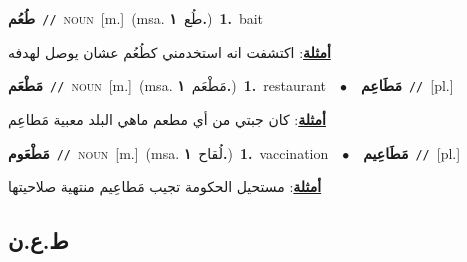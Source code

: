 \documentclass[10pt,a4paper,twoside]{article} %
\begin{document}
\begin{multicols}{2}
{\setlength\topsep{0pt}\textbf{\foreignlanguage{arabic}{طُعُم}}\ {\color{gray}\texttt{//}\color{black}}\ \textsc{noun}\ [m.]\ \color{gray}(msa. \foreignlanguage{arabic}{طُع}~\foreignlanguage{arabic}{\textbf{١.}})\color{black}\ \textbf{1.}~bait\  \begin{flushright}\color{gray}\foreignlanguage{arabic}{\textbf{\underline{\foreignlanguage{arabic}{أمثلة}}}: اكتشفت انه استخدمني كطُعُم عشان يوصل لهدفه}\end{flushright}\color{black}} \vspace{2mm}

{\setlength\topsep{0pt}\textbf{\foreignlanguage{arabic}{مَطْعَم}}\ {\color{gray}\texttt{//}\color{black}}\ \textsc{noun}\ [m.]\ \color{gray}(msa. \foreignlanguage{arabic}{مَطْعَم}~\foreignlanguage{arabic}{\textbf{١.}})\color{black}\ \textbf{1.}~restaurant\ \ $\bullet$\ \ \setlength\topsep{0pt}\textbf{\foreignlanguage{arabic}{مَطَاعِم}}\ {\color{gray}\texttt{//}\color{black}}\ [pl.]\  \begin{flushright}\color{gray}\foreignlanguage{arabic}{\textbf{\underline{\foreignlanguage{arabic}{أمثلة}}}: كان جبتي من أي مطعم ماهي البلد معبية مَطاعِم}\end{flushright}\color{black}} \vspace{2mm}

{\setlength\topsep{0pt}\textbf{\foreignlanguage{arabic}{مَطْعَوم}}\ {\color{gray}\texttt{//}\color{black}}\ \textsc{noun}\ [m.]\ \color{gray}(msa. \foreignlanguage{arabic}{لُقاح}~\foreignlanguage{arabic}{\textbf{١.}})\color{black}\ \textbf{1.}~vaccination\ \ $\bullet$\ \ \setlength\topsep{0pt}\textbf{\foreignlanguage{arabic}{مَطَاعِيم}}\ {\color{gray}\texttt{//}\color{black}}\ [pl.]\  \begin{flushright}\color{gray}\foreignlanguage{arabic}{\textbf{\underline{\foreignlanguage{arabic}{أمثلة}}}: مستحيل الحكومة تجيب مَطاعِيم منتهية صلاحيتها}\end{flushright}\color{black}} \vspace{2mm}

\vspace{-3mm}
\subsection*{\color{blue}\foreignlanguage{arabic}{ط.ع.ن}\color{blue}{}} 


\end{multicols}
\end{document}
